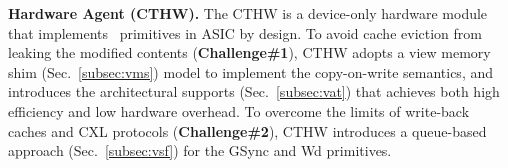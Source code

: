 

\ifx\undefined\stale
\noindent \textbf{Hardware Agent (CTHW). } The CTHW is a device-only hardware module that implements \name~primitives in ASIC by design. To avoid cache eviction from leaking the modified contents (\textbf{Challenge\#1}), CTHW adopts a view memory shim (Sec.~\ref{subsec:vms}) model to implement the copy-on-write semantics, and introduces the architectural supports (Sec.~\ref{subsec:vat}) that achieves both high efficiency and low hardware overhead. To overcome the limits of write-back caches and CXL protocols (\textbf{Challenge\#2}), CTHW introduces a queue-based approach (Sec.~\ref{subsec:vsf}) for the GSync and Wd primitives.




